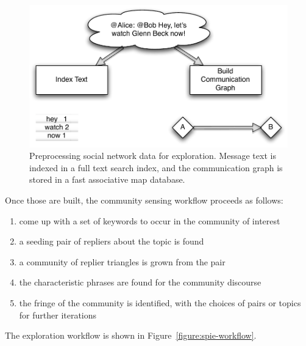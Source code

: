 \documentclass[10pt,oneside]{memoir}
\begin{document}
\begin{Spacing}{2}
\begin{figure}[htp]
\begin{center}
\includegraphics{figures/spie-preprocessing}
\caption{Preprocessing social network data for exploration.  Message text is indexed in a full text search index, and the communication graph is stored in a fast associative map database.}
\label{figure:spie-preprocessing}
\end{center}
\end{figure}
Once those are built, the community sensing workflow proceeds as
follows:


\begin{enumerate}


\item come up with a set of keywords to occur in the community of
interest




\item a seeding pair of repliers about the topic is found




\item a community of replier triangles is grown from the pair




\item the characteristic phrases are found for the community
discourse




\item the fringe of the community is identified, with the choices of
pairs or topics for further iterations



\end{enumerate}

The exploration workflow is shown in Figure~\ref{figure:spie-workflow}.




\end{Spacing}
\end{document}
